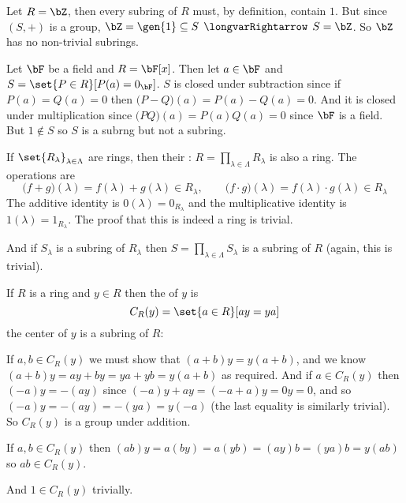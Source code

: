 \documentclass[10pt]{article}
\def\implies{\,\mathrel{\longvarRightarrow}\,}
\begin{document}
\begin{exam*}

    Let $R=\bZ$, then every subring of $R$ must, by definition, contain $1$.
    But since $(S,+)$ is a group, $\bZ=\gen{1}\subseteq S\implies S=\bZ$.
    So $\bZ$ has no non-trivial subrings.

\end{exam*}

\begin{exam*}

    Let $\bF$ be a field and $R=\bF[x]$.
    Then let $a\in\bF$ and $S=\set{P\in R}[P(a)=0_{\bF}]$.
    $S$ is closed under subtraction since if $P(a)=Q(a)=0$ then $\bigl(P-Q\bigr)(a)=P(a)-Q(a)=0$.
    And it is closed under multiplication since $\bigl(PQ\bigr)(a)=P(a)Q(a)=0$ since $\bF$ is a field.
    But $1\notin S$ so $S$ is a subrng but not a subring.

\end{exam*}

\begin{exam*}

    If $\set{R_\lambda}_{\lambda\in\Lambda}$ are rings, then their : $R=\prod_{\lambda\in\Lambda}R_\lambda$ is also a ring.
    The operations are
    \[ \bigl(f+g\bigr)(\lambda)=f(\lambda)+g(\lambda)\in R_\lambda,\qquad \bigl(f\cdot g\bigr)(\lambda)=f(\lambda)\cdot g(\lambda)\in R_\lambda \]
    The additive identity is $0(\lambda)=0_{R_\lambda}$ and the multiplicative identity is $1(\lambda)=1_{R_\lambda}$.
    The proof that this is indeed a ring is trivial.

    And if $S_\lambda$ is a subring of $R_\lambda$ then $S=\prod_{\lambda\in\Lambda}S_\lambda$ is a subring of $R$ (again, this is trivial).

\end{exam*}

\begin{exam*}

    If $R$ is a ring and $y\in R$ then the  of $y$ is
    \[ C_R(y) = \set{a\in R}[ay = ya] \]
    the center of $y$ is a subring of $R$:
    \benum
        \item If $a,b\in C_R(y)$ we must show that $(a+b)y=y(a+b)$, and we know $(a+b)y=ay+by=ya+yb=y(a+b)$ as required.
        And if $a\in C_R(y)$ then $(-a)y=-(ay)$ since $(-a)y+ay=(-a+a)y=0y=0$, and so $(-a)y=-(ay)=-(ya)=y(-a)$ (the last equality is similarly trivial).
        So $C_R(y)$ is a group under addition.
        \item If $a,b\in C_R(y)$ then $(ab)y=a(by)=a(yb)=(ay)b=(ya)b=y(ab)$ so $ab\in C_R(y)$.
        \item And $1\in C_R(y)$ trivially.
    \eenum

\end{exam*}
\end{document}
